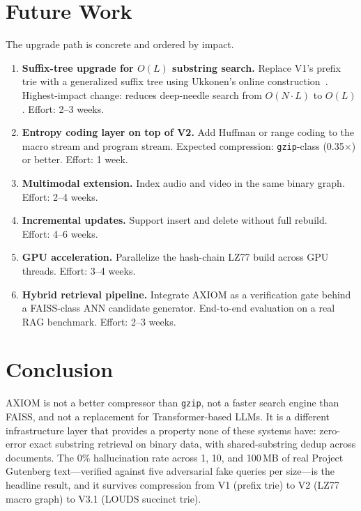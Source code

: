 \documentclass[conference]{IEEEtran}
\begin{document}
\section{Future Work}
\label{sec:future}

The upgrade path is concrete and ordered by impact.

\begin{enumerate}
\item \textbf{Suffix-tree upgrade for $O(L)$ substring search.} Replace V1's prefix trie with a generalized suffix tree using Ukkonen's online construction~\cite{ukkonen1995}. Highest-impact change: reduces deep-needle search from $O(N{\cdot}L)$ to $O(L)$. Effort: 2--3 weeks.
\item \textbf{Entropy coding layer on top of V2.} Add Huffman or range coding to the macro stream and program stream. Expected compression: \texttt{gzip}-class (0.35$\times$) or better. Effort: 1 week.
\item \textbf{Multimodal extension.} Index audio and video in the same binary graph. Effort: 2--4 weeks.
\item \textbf{Incremental updates.} Support insert and delete without full rebuild. Effort: 4--6 weeks.
\item \textbf{GPU acceleration.} Parallelize the hash-chain LZ77 build across GPU threads. Effort: 3--4 weeks.
\item \textbf{Hybrid retrieval pipeline.} Integrate AXIOM as a verification gate behind a FAISS-class ANN candidate generator. End-to-end evaluation on a real RAG benchmark. Effort: 2--3 weeks.
\end{enumerate}

\section{Conclusion}

AXIOM is not a better compressor than \texttt{gzip}, not a faster search engine than FAISS, and not a replacement for Transformer-based LLMs. It is a different infrastructure layer that provides a property none of these systems have: zero-error exact substring retrieval on binary data, with shared-substring dedup across documents. The 0\% hallucination rate across 1, 10, and 100\,MB of real Project Gutenberg text---verified against five adversarial fake queries per size---is the headline result, and it survives compression from V1 (prefix trie) to V2 (LZ77 macro graph) to V3.1 (LOUDS succinct trie).
\end{document}
